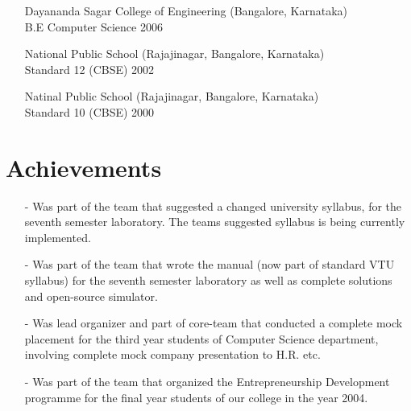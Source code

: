 \documentclass[a4paper,12pt]{article}
\begin{document}
\begin{itemize}
\item[] Dayananda Sagar College of Engineering (Bangalore,
  Karnataka)\\ B.E Computer Science \hfill 2006
\item[] National Public School (Rajajinagar, Bangalore,
  Karnataka)\\ Standard 12 (CBSE) \hfill 2002
\item[] Natinal Public School (Rajajinagar, Bangalore,
  Karnataka)\\ Standard 10 (CBSE) \hfill 2000
\end{itemize}

\section{Achievements}

\begin{itemize}

\item[-] Was part of the team that suggested a changed university syllabus, for the seventh semester laboratory. The teams suggested syllabus is being currently implemented.
\item[-] Was part of the team that wrote the manual (now part of
  standard VTU syllabus) for the seventh
  semester laboratory as well as complete solutions and open-source
  simulator.
\item[-] Was lead organizer and part of core-team that conducted a complete mock placement for the third year students of Computer Science department, involving complete mock company presentation to H.R. etc.
\item[-] Was part of the team that organized the Entrepreneurship Development programme for the final year students of our college in the year 2004.
\end{itemize}
\end{document}
